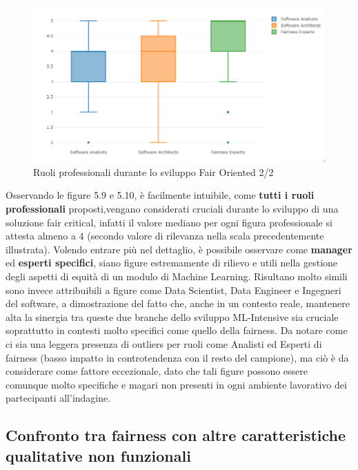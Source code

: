      \begin{figure}[h!]
        \centering
        \includegraphics[width=1\textwidth]{figure/Analisi/RQ2/RoleImpactBoxPlot2.png}
        \caption{Ruoli professionali durante lo sviluppo Fair Oriented 2/2}
    \end{figure}
	 
	 
	 Osservando le figure 5.9 e 5.10, è facilmente intuibile, come \textbf{tutti i ruoli professionali} proposti,vengano considerati cruciali durante lo sviluppo di una soluzione fair critical, infatti il valore mediano per ogni figura professionale si attesta almeno a 4 (secondo valore di rilevanza nella scala precedentemente illustrata). Volendo entrare più nel dettaglio, è possibile osservare come \textbf{manager} ed \textbf{esperti specifici}, siano figure estremamente di rilievo e utili nella gestione degli aspetti di equità di un modulo di Machine Learning. Risultano molto simili sono invece attribuibili a figure come Data Scientist, Data Engineer e Ingegneri del software, a dimostrazione del fatto che, anche in un contesto reale, mantenere alta la sinergia tra queste due branche dello sviluppo ML-Intensive sia cruciale soprattutto in contesti molto specifici come quello della fairness. Da notare come ci sia una leggera presenza di outliers per ruoli come Analisti ed Esperti di fairness (basso impatto in controtendenza con il resto del campione), ma ciò è da considerare come fattore eccezionale, dato che tali figure possono essere comunque molto specifiche e magari non presenti in ogni ambiente lavorativo dei partecipanti all'indagine.
    \subsection{Confronto tra fairness con altre caratteristiche qualitative non funzionali}
    
